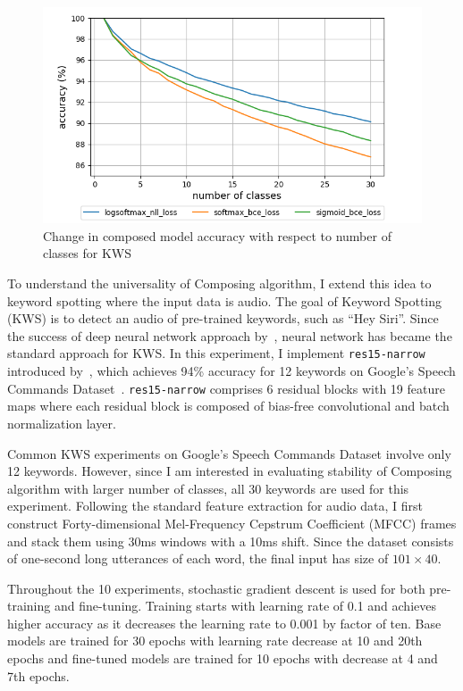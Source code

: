 \documentclass{article}
\begin{document}
\begin{figure}[t]
    \centering
    \includegraphics[scale=0.4,trim={0mm 0mm 0mm 0mm},clip]{kws.png}
    \caption{Change in composed model accuracy with respect to number of classes for KWS}
    \label{figure:composed_kws}
\end{figure}


To understand the universality of Composing algorithm, I extend this idea to keyword spotting where the input data is audio. The goal of Keyword Spotting (KWS) is to detect an audio of pre-trained keywords, such as “Hey Siri”. Since the success of deep neural network approach by~\cite{chen2014small}, neural network has became the standard approach for KWS. In this experiment, I implement \texttt{res15-narrow} introduced by~\cite{tang2018deep}, which achieves 94\% accuracy for 12 keywords on Google’s Speech Commands Dataset~\cite{speechcommandsdataset}. \texttt{res15-narrow} comprises 6 residual blocks with 19 feature maps where each residual block is composed of bias-free convolutional and batch normalization layer.

Common KWS experiments on Google’s Speech Commands Dataset involve only 12 keywords. However, since I am interested in evaluating stability of Composing algorithm with larger number of classes, all 30 keywords are used for this experiment. Following the standard feature extraction for audio data, I first construct Forty-dimensional Mel-Frequency Cepstrum Coefficient (MFCC) frames and stack them using 30ms windows with a 10ms shift. Since the dataset consists of one-second long utterances of each word, the final input has size of $101\times40$.

Throughout the 10 experiments, stochastic gradient descent is used for both pre-training and fine-tuning. Training starts with learning rate of 0.1 and achieves higher accuracy as it decreases the learning rate to 0.001 by factor of ten. Base models are trained for 30 epochs with learning rate decrease at 10 and 20th epochs and fine-tuned models are trained for 10 epochs with decrease at 4 and 7th epochs.
\end{document}
